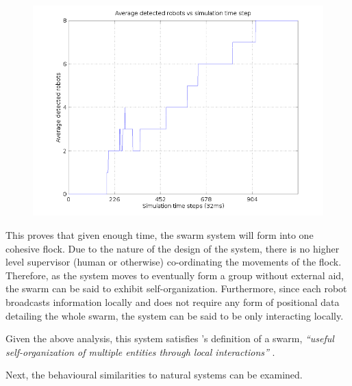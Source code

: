 \begin{figure}[!t]
		\centering
	\begin{minipage}{1\textwidth}
		\centering
		\includegraphics[width=1\linewidth]{data1-average}
		\label{fig:exp1-avg}
	\end{minipage}%
\end{figure}

This proves that given enough time, the swarm system will form into one cohesive flock. Due to the nature of the design of the system, there is no higher level supervisor (human or otherwise) co-ordinating the movements of the flock. Therefore, as the system moves to eventually form a group without external aid, the swarm can be said to exhibit self-organization. Furthermore, since each robot broadcasts information locally and does not require any form of positional data detailing the whole swarm, the system can be said to be only interacting locally.

Given the above analysis, this system satisfies \citeauthor{VanDykeParunak2004}'s definition of a swarm, \textit{``useful self-organization of multiple entities through local interactions''} \cite{VanDykeParunak2004}.

Next, the behavioural similarities to natural systems can be examined.

\clearpage

